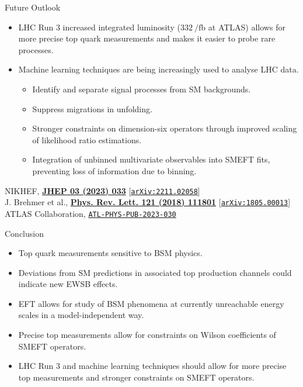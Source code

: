 \documentclass{beamer}
\begin{document}
\begin{frame}{Future Outlook}
  \begin{itemize}
    \item LHC Run 3 increased integrated luminosity ($\qty{332}{\per\femto\barn}$ at ATLAS) allows for more precise top quark measurements and makes it easier to probe rare processes.
    \item Machine learning techniques are being increasingly used to analyse LHC data.
    \begin{itemize}
      \item Identify and separate signal processes from SM backgrounds.
      \item Suppress migrations in unfolding.
      \item Stronger constraints on dimension-six operators through improved scaling of likelihood ratio estimations.
      \item Integration of unbinned multivariate observables into SMEFT fits, preventing loss of information due to binning.
    \end{itemize}
  \end{itemize}
  {\tiny \color{gray} NIKHEF, \textbf{\href{https://doi.org/10.1007/JHEP03(2023)033}{JHEP 03 (2023) 033}} [\href{https://arxiv.org/abs/2211.02058v2}{\texttt{arXiv:2211.02058}}]} \\
  {\tiny \color{gray} J. Brehmer et al., \textbf{\href{https://doi.org/10.1103/PhysRevLett.121.111801}{Phys. Rev. Lett. 121 (2018) 111801}} [\href{https://arxiv.org/abs/1805.00013v2}{\texttt{arXiv:1805.00013}}]} \\
  {\tiny \color{gray} ATLAS Collaboration, \href{https://cds.cern.ch/record/2872789/}{\texttt{ATL-PHYS-PUB-2023-030}}}
\end{frame}

\begin{frame}{Conclusion}
  \begin{itemize}
    \item Top quark measurements sensitive to BSM physics.
    \item Deviations from SM predictions in associated top production channels could indicate new EWSB effects.
    \item EFT allows for study of BSM phenomena at currently unreachable energy scales in a model-independent way.
    \item Precise top measurements allow for constraints on Wilson coefficients of SMEFT operators.
    \item LHC Run 3 and machine learning techniques should allow for more precise top measurements and stronger constraints on SMEFT operators.
  \end{itemize}
\end{frame}
\end{document}
